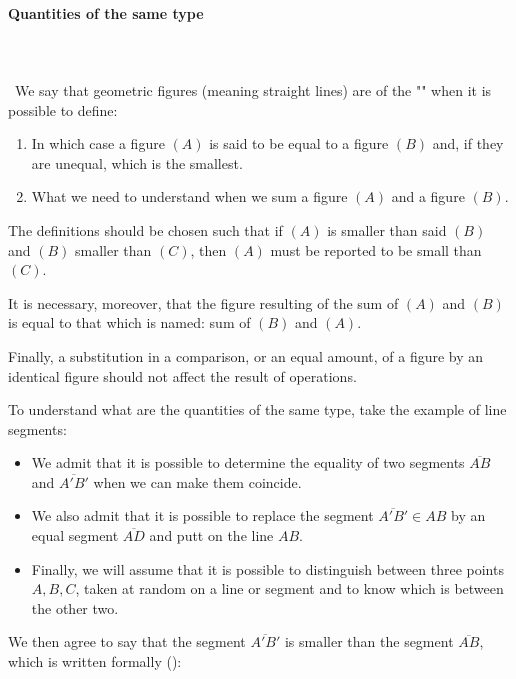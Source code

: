 	\pagebreak
	\paragraph{Quantities of the same type}\mbox{}\\\\\
	We say that geometric figures (meaning straight lines) are of the "" when it is possible to define:
	\begin{enumerate}
		\item In which case a figure $(A)$ is said to be equal to a figure $(B)$ and, if they are unequal, which is the smallest.
		
		\item What we need to understand when we sum a figure $(A)$ and a figure $(B)$.
	\end{enumerate}
	The definitions should be chosen such that if $(A)$ is smaller than said $(B)$ and $(B)$ smaller than $(C)$, then $(A)$ must be reported to be small than $(C)$.
	
	It is necessary, moreover, that the figure resulting of the sum of $(A)$ and $(B)$ is equal to that which is named: sum of $(B)$ and $(A)$.
	
	Finally, a substitution in a comparison, or an equal amount, of a figure by an identical figure should not affect the result of operations.
	
	To understand what are the quantities of the same type, take the example of line segments:
	\begin{itemize}
		\item We admit that it is possible to determine the equality of two segments $\overline{AB}$ and $\overline{A'B'}$ when we can make them coincide.
		
		\item We also admit that it is possible to replace the segment $\overline{A'B'} \in AB$ by an equal segment $\overline{AD}$ and putt on the line $AB$.
		
		\item Finally, we will assume that it is possible to distinguish between three points $A, B, C$, taken at random on a line or segment and to know which is between the other two.
	\end{itemize}
	
	We then agree to say that the segment $\overline{A'B'}$ is smaller than the segment $\overline{AB}$, which is written formally 
(\SeeChapter{see section Operators}):
	
